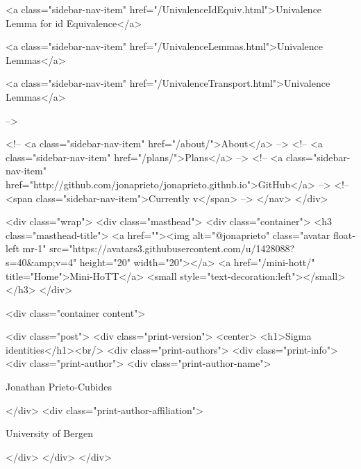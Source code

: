       
    
      
        
          <a class="sidebar-nav-item" href="/UnivalenceIdEquiv.html">Univalence Lemma for id Equivalence</a>
        
      
    
      
        
          <a class="sidebar-nav-item" href="/UnivalenceLemmas.html">Univalence Lemmas</a>
        
      
    
      
        
          <a class="sidebar-nav-item" href="/UnivalenceTransport.html">Univalence Lemmas</a>
        
      
     -->

    <!-- <a class="sidebar-nav-item" href="/about/">About</a> -->
    <!-- <a class="sidebar-nav-item" href="/plans/">Plans</a> -->
    <!-- <a class="sidebar-nav-item" href="http://github.com/jonaprieto/jonaprieto.github.io">GitHub</a> -->
    <!-- <span class="sidebar-nav-item">Currently v</span> -->
  </nav>
</div>

    <div class="wrap">
      <div class="masthead">
        <div class="container">
          <h3 class="masthead-title">
            <a href=""><img alt="@jonaprieto" class="avatar float-left mr-1" src="https://avatars3.githubusercontent.com/u/1428088?s=40&amp;v=4" height="20" width="20"></a>
            <a href="/mini-hott/" title="Home">Mini-HoTT</a>
            <small style="text-decoration:left"></small>
          </h3>
        </div>
      
      <div class="container content">
        







<div class="post">
  <div class="print-version">
    <center>
      <h1>Sigma identities</h1><br/>
        <div class="print-authors">
          <div class="print-info">
            <div class="print-author">
              <div class="print-author-name">
                
                  Jonathan Prieto-Cubides
                
              </div>
              <div class="print-author-affiliation">
                
                  University of Bergen
                
                </div>
            </div>
          </div>
          
